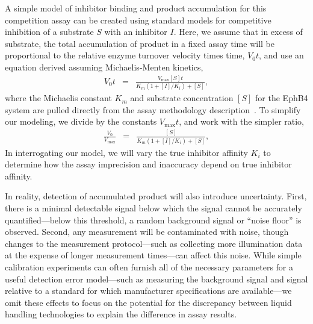 \documentclass[aps,pre,twocolumn,nofootinbib,superscriptaddress,linenumbers]{revtex4-1}
\begin{document}
A simple model of inhibitor binding and product accumulation for this competition assay can be created using standard models for competitive inhibition of a substrate $S$ with an inhibitor $I$. 
Here, we assume that in excess of substrate, the total accumulation of product in a fixed assay time will be proportional to the relative enzyme turnover velocity times time, $V_0 t$, and use an equation derived assuming Michaelis-Menten kinetics,
\begin{eqnarray}
V_{0} t &=& \frac{V_\mathrm{max} [S] t}{K_{m}\left(1+[I]/K_{i}\right)+[S]} ,
\end{eqnarray}
where the Michaelis constant $K_{m}$ and substrate concentration $[S]$ for the EphB4 system are pulled directly from the assay methodology description~\cite{barlaam_novel_2009,barlaam_pyrimidine_2010}.
To simplify our modeling, we divide by the constants $V_\mathrm{max} t$, and work with the simpler ratio,
\begin{eqnarray}
\frac{V_{0}}{V_\mathrm{max}} &=& \frac{[S]}{K_{m}\left(1+[I]/K_{i}\right)+[S]} \label{equation:competitive-inhibition} ,
\end{eqnarray}
In interrogating our model, we will vary the true inhibitor affinity $K_{i}$ to determine how the assay imprecision and inaccuracy depend on true inhibitor affinity.

In reality, detection of accumulated product will also introduce uncertainty.
First, there is a minimal detectable signal below which the signal cannot be accurately quantified---below this threshold, a random background signal or ``noise floor'' is observed.
Second, any measurement will be contaminated with noise, though changes to the measurement protocol---such as collecting more illumination data at the expense of longer measurement times---can affect this noise.
While simple calibration experiments can often furnish all of the necessary parameters for a useful detection error model---such as measuring the background signal and signal relative to a standard for which manufacturer specifications are available---we omit these effects to focus on the potential for the discrepancy between liquid handling technologies to explain the difference in assay results.
\end{document}
